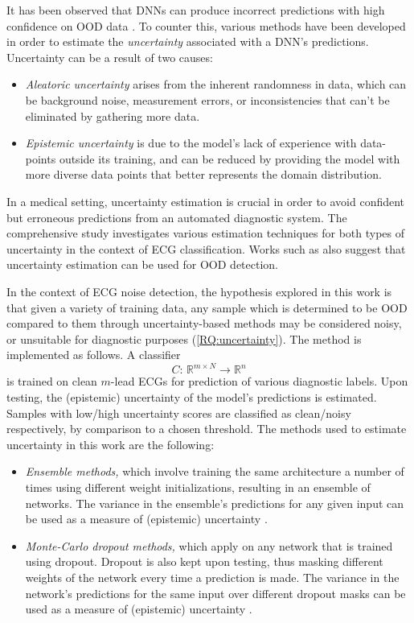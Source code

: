 \documentclass[a4paper,10pt]{article}
\newcommand{\R}{\mathbb{R}}
\begin{document}
It has been observed that DNNs can produce incorrect predictions with high confidence on OOD data \cite{calibration}. To counter this, various methods have been developed in order to estimate the \emph{uncertainty} associated with a DNN's predictions. Uncertainty can be a result of two causes:
\begin{itemize}
	\item \emph{Aleatoric uncertainty} arises from the inherent randomness in data, which can be background noise, measurement errors, or inconsistencies that can't be eliminated by gathering more data.
	\item \emph{Epistemic uncertainty} is due to the model's lack of experience with data-points outside its training, and can be reduced by providing the model with more diverse data points that better represents the domain distribution.
\end{itemize}
In a medical setting, uncertainty estimation is crucial in order to avoid confident but erroneous predictions from an automated diagnostic system. The comprehensive study \cite{uncertainty_cordys} investigates various estimation techniques for both types of uncertainty in the context of ECG classification. Works such as \cite{uncertainty_ood} also suggest that uncertainty estimation can be used for OOD detection.

In the context of ECG noise detection, the hypothesis explored in this work is that given a variety of training data, any sample which is determined to be OOD compared to them through uncertainty-based methods may be considered noisy, or unsuitable for diagnostic purposes (\ref{RQ:uncertainty}). The method is implemented as follows. A classifier
\[
	C:\, \R^{m\times N} \to \R^n
\]
is trained on clean $m$-lead ECGs for prediction of various diagnostic labels. Upon testing, the (epistemic) uncertainty of the model's predictions is estimated. Samples with low/high uncertainty scores are classified as clean/noisy respectively, by comparison to a chosen threshold. The methods used to estimate uncertainty in this work are the following:
\begin{itemize}
	\item \emph{Ensemble methods,} which involve training the same architecture a number of times using different weight initializations, resulting in an ensemble of networks. The variance in the ensemble's predictions for any given input can be used as a measure of (epistemic) uncertainty \cite{uncertainty_cordys}.
	\item \emph{Monte-Carlo dropout methods,} which apply on any network that is trained using dropout. Dropout is also kept upon testing, thus masking different weights of the network every time a prediction is made. The variance in the network's predictions for the same input over different dropout masks can be used as a measure of (epistemic) uncertainty \cite{uncertainty_cordys}.
\end{itemize}
\end{document}
